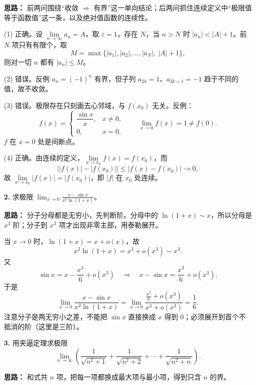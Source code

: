 \ifshowsolutions%
\textbf{思路：} 前两问围绕“收敛 $\Rightarrow$ 有界”这一单向结论；后两问抓住连续定义中“极限值等于函数值”这一条，以及绝对值函数的连续性。

(1) 正确。设 $\lim\limits_{n\to\infty}a_n=A$，取 $\varepsilon=1$，存在 $N$，当 $n>N$ 时 $|a_n|<|A|+1$。前 $N$ 项只有有限个，取
\[
M=\max\bigl\{|a_1|,|a_2|,\dots,|a_N|,\ |A|+1\bigr\},
\]
则对一切 $n$ 都有 $|a_n|\le M$。

(2) 错误。反例 $a_n=(-1)^n$ 有界，但子列 $a_{2k}=1$、$a_{2k+1}=-1$ 趋于不同的值，故不收敛。

(3) 错误。极限存在只刻画去心邻域，与 $f(x_0)$ 无关。反例：
\[
f(x)=\begin{cases}\dfrac{\sin x}{x}, & x\ne 0,\\[6pt] 0, & x=0,\end{cases}
\qquad \lim_{x\to0}f(x)=1\ne f(0).
\]
$f$ 在 $x=0$ 处是间断点。

(4) 正确。由连续的定义，$\lim\limits_{x\to x_0}f(x)=f(x_0)$，而
\[
\bigl||f(x)|-|f(x_0)|\bigr|\le|f(x)-f(x_0)|\to 0,
\]
故 $\lim\limits_{x\to x_0}|f(x)|=|f(x_0)|$，即 $|f|$ 在 $x_0$ 处连续。


\else \answerarea[10] \fi%

\textbf{2.} 求极限 $\displaystyle\lim_{x\to 0}\frac{x-\sin x}{x^2\ln(1+x)}$。

\ifshowsolutions%
\textbf{思路：} 分子分母都是无穷小，先判断阶。分母中的 $\ln(1+x)\sim x$，所以分母是 $x^3$ 阶；分子到 $x^3$ 项才出现非零主部，用泰勒展开。

当 $x\to0$ 时，$\ln(1+x)=x+o(x)$，故
\[
x^2\ln(1+x)=x^3+o(x^3)\sim x^3 .
\]
又
\[
\sin x=x-\frac{x^3}{6}+o(x^3)\quad\Longrightarrow\quad x-\sin x=\frac{x^3}{6}+o(x^3).
\]
于是
\[
\lim_{x\to0}\frac{x-\sin x}{x^2\ln(1+x)}
=\lim_{x\to0}\frac{\frac{x^3}{6}+o(x^3)}{x^3+o(x^3)}
=\frac{1}{6}.
\]
注意分子是两无穷小之差，不能把 $\sin x$ 直接换成 $x$ 得到 $0$；必须展开到首个不抵消的阶（这里是三阶）。


\else \answerarea[8] \fi%

\textbf{3.} 用夹逼定理求极限
\[
\lim_{n\to\infty}\left(\frac{1}{\sqrt{n^2+1}}+\frac{1}{\sqrt{n^2+2}}+\cdots+\frac{1}{\sqrt{n^2+n}}\right).
\]

\ifshowsolutions%
\textbf{思路：} 和式共 $n$ 项，把每一项都换成最大项与最小项，得到只含 $n$ 的界。

